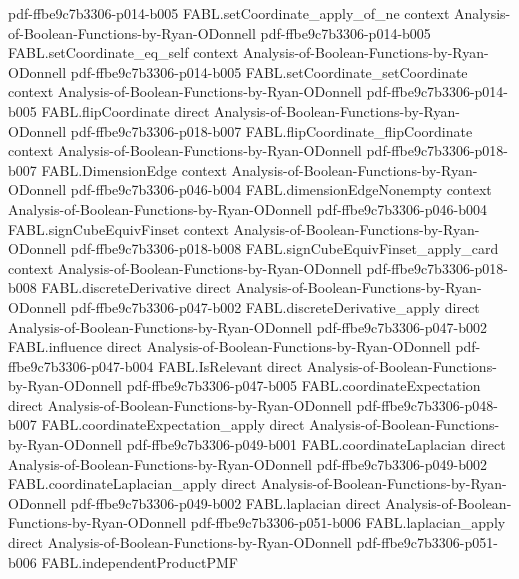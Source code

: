 \begin{theorem}
  {pdf-ffbe9c7b3306-p014-b005}
\proofstep
  {FABL.setCoordinate_apply_of_ne}
  {context}
  {Analysis-of-Boolean-Functions-by-Ryan-ODonnell}
  {pdf-ffbe9c7b3306-p014-b005}
\proofstep
  {FABL.setCoordinate_eq_self}
  {context}
  {Analysis-of-Boolean-Functions-by-Ryan-ODonnell}
  {pdf-ffbe9c7b3306-p014-b005}
\proofstep
  {FABL.setCoordinate_setCoordinate}
  {context}
  {Analysis-of-Boolean-Functions-by-Ryan-ODonnell}
  {pdf-ffbe9c7b3306-p014-b005}
\proofstep
  {FABL.flipCoordinate}
  {direct}
  {Analysis-of-Boolean-Functions-by-Ryan-ODonnell}
  {pdf-ffbe9c7b3306-p018-b007}
\proofstep
  {FABL.flipCoordinate_flipCoordinate}
  {context}
  {Analysis-of-Boolean-Functions-by-Ryan-ODonnell}
  {pdf-ffbe9c7b3306-p018-b007}
\proofstep
  {FABL.DimensionEdge}
  {context}
  {Analysis-of-Boolean-Functions-by-Ryan-ODonnell}
  {pdf-ffbe9c7b3306-p046-b004}
\proofstep
  {FABL.dimensionEdgeNonempty}
  {context}
  {Analysis-of-Boolean-Functions-by-Ryan-ODonnell}
  {pdf-ffbe9c7b3306-p046-b004}
\proofstep
  {FABL.signCubeEquivFinset}
  {context}
  {Analysis-of-Boolean-Functions-by-Ryan-ODonnell}
  {pdf-ffbe9c7b3306-p018-b008}
\proofstep
  {FABL.signCubeEquivFinset_apply_card}
  {context}
  {Analysis-of-Boolean-Functions-by-Ryan-ODonnell}
  {pdf-ffbe9c7b3306-p018-b008}
\proofstep
  {FABL.discreteDerivative}
  {direct}
  {Analysis-of-Boolean-Functions-by-Ryan-ODonnell}
  {pdf-ffbe9c7b3306-p047-b002}
\proofstep
  {FABL.discreteDerivative_apply}
  {direct}
  {Analysis-of-Boolean-Functions-by-Ryan-ODonnell}
  {pdf-ffbe9c7b3306-p047-b002}
\proofstep
  {FABL.influence}
  {direct}
  {Analysis-of-Boolean-Functions-by-Ryan-ODonnell}
  {pdf-ffbe9c7b3306-p047-b004}
\proofstep
  {FABL.IsRelevant}
  {direct}
  {Analysis-of-Boolean-Functions-by-Ryan-ODonnell}
  {pdf-ffbe9c7b3306-p047-b005}
\proofstep
  {FABL.coordinateExpectation}
  {direct}
  {Analysis-of-Boolean-Functions-by-Ryan-ODonnell}
  {pdf-ffbe9c7b3306-p048-b007}
\proofstep
  {FABL.coordinateExpectation_apply}
  {direct}
  {Analysis-of-Boolean-Functions-by-Ryan-ODonnell}
  {pdf-ffbe9c7b3306-p049-b001}
\proofstep
  {FABL.coordinateLaplacian}
  {direct}
  {Analysis-of-Boolean-Functions-by-Ryan-ODonnell}
  {pdf-ffbe9c7b3306-p049-b002}
\proofstep
  {FABL.coordinateLaplacian_apply}
  {direct}
  {Analysis-of-Boolean-Functions-by-Ryan-ODonnell}
  {pdf-ffbe9c7b3306-p049-b002}
\proofstep
  {FABL.laplacian}
  {direct}
  {Analysis-of-Boolean-Functions-by-Ryan-ODonnell}
  {pdf-ffbe9c7b3306-p051-b006}
\proofstep
  {FABL.laplacian_apply}
  {direct}
  {Analysis-of-Boolean-Functions-by-Ryan-ODonnell}
  {pdf-ffbe9c7b3306-p051-b006}
\proofstep
  {FABL.independentProductPMF}

\end{theorem}

